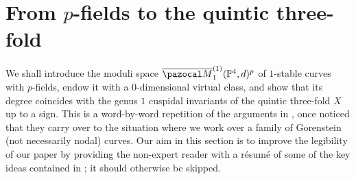 \documentclass[11pt]{amsart}
\newcommand{\Mone}[3]{\overline{\pazocal M}^{(1)}_{#1}(#2,#3)}
\newcommand{\PP}{\mathbb P}
\theoremstyle{plain}
\theoremstyle{definition}
\begin{document}

\section{From $p$-fields to the quintic three-fold}\label{section:p-fields}
We shall introduce the moduli space $\Mone{1}{\PP^4}{d}^p$ of $1$-stable curves with $p$-fields, endow it with a $0$-dimensional virtual class, and show that its degree coincides with the genus $1$ cuspidal invariants of the quintic three-fold $X$ up to a sign. This is a word-by-word repetition of the arguments in \cite{CLpfields}, once noticed that they carry over to the situation where we work over a family of Gorenstein (not necessarily nodal) curves. Our aim in this section is to improve the legibility of our paper by providing the non-expert reader with a r\'{e}sum\'{e} of some of the key ideas contained in \cite{CLpfields}; it should otherwise be skipped.
\end{document}

